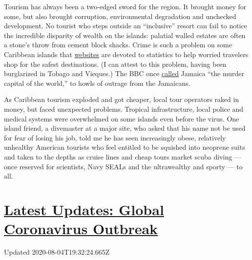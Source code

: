 Tourism has always been a two-edged sword for the region. It brought
money for some, but also brought corruption, environmental degradation
and unchecked development. No tourist who steps outside an ``inclusive''
resort can fail to notice the incredible disparity of wealth on the
islands: palatial walled estates are often a stone's throw from cement
block shacks. Crime is such a problem on some Caribbean islands that
\href{https://www.tripsavvy.com/safest-and-most-dangerous-caribbean-islands-4157732}{websites}
are devoted to statistics to help worried travelers shop for the safest
destinations. (I can attest to this problem, having been burglarized in
Tobago and Vieques.) The BBC once
\href{http://www.bbc.co.uk/caribbean/news/story/2006/01/060103_murderlist.shtml}{called}
Jamaica ``the murder capital of the world,'' to howls of outrage from
the Jamaicans.

As Caribbean tourism exploded and got cheaper, local tour operators
raked in money, but faced unexpected problems. Tropical infrastructure,
local police and medical systems were overwhelmed on some islands even
before the virus. One island friend, a divemaster at a major site, who
asked that his name not be used for fear of losing his job, told me he
has seen increasingly obese, relatively unhealthy American tourists who
feel entitled to be squished into neoprene suits and taken to the depths
as cruise lines and cheap tours market scuba diving --- once reserved
for scientists, Navy SEALs and the ultrawealthy and sporty --- to all.

\hypertarget{latest-updates-global-coronavirus-outbreak}{%
\section{\texorpdfstring{\href{https://www.nytimes.com/2020/08/04/world/coronavirus-cases.html?action=click\&pgtype=Article\&state=default\&region=MAIN_CONTENT_1\&context=storylines_live_updates}{Latest
Updates: Global Coronavirus
Outbreak}}{Latest Updates: Global Coronavirus Outbreak}}\label{latest-updates-global-coronavirus-outbreak}}

Updated 2020-08-04T19:32:24.665Z


